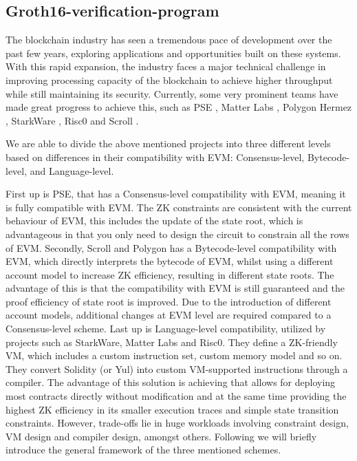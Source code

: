 \subsection{Groth16-verification-program}

The blockchain industry has seen a tremendous pace of development over the past few years, exploring applications and opportunities built on these systems. With this rapid expansion, the industry faces a major technical challenge in improving processing capacity of the blockchain to achieve higher throughput while still maintaining its security. Currently, some very prominent teams have made great progress to achieve this, such as PSE \cite{website:pse}, Matter Labs \cite{website:matter-labs}, Polygon Hermez \cite{website:hermez}, StarkWare \cite{website:starkware}, Risc0 \cite{website:risc0} and Scroll \cite{website:scroll}.

We are able to divide the above mentioned projects into three different levels based on differences in their compatibility with EVM: Consensus-level, Bytecode-level, and Language-level.

First up is PSE, that has a Consensus-level compatibility with EVM, meaning it is fully compatible with EVM. The ZK constraints are consistent with the current behaviour of EVM, this includes the update of the state root, which is advantageous in that you only need to design the circuit to constrain all the rows of EVM. Secondly, Scroll and Polygon has a Bytecode-level compatibility with EVM, which directly interprets the bytecode of EVM, whilst using a different account model to increase ZK efficiency, resulting in different state roots. The advantage of this is that the compatibility with EVM is still guaranteed and the proof efficiency of state root is improved. Due to the introduction of different account models, additional changes at EVM level are required compared to a Consensus-level scheme. Last up is Language-level compatibility, utilized by projects such as StarkWare, Matter Labs and Risc0. They define a ZK-friendly VM, which includes a custom instruction set, custom memory model and so on. They convert Solidity (or Yul) into custom VM-supported instructions through a compiler. The advantage of this solution is achieving that allows for deploying most contracts directly without modification and at the same time providing the highest ZK efficiency in its smaller execution traces and simple state transition constraints. However, trade-offs lie in huge workloads involving constraint design, VM design and compiler design, amongst others. Following we will briefly introduce the general framework of the three mentioned schemes.

